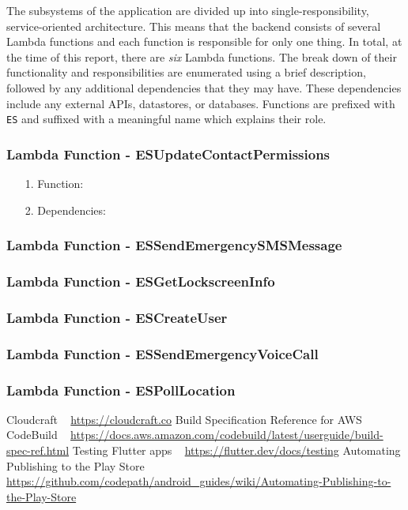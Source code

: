 \documentclass[10pt, a4paper]{article}
\begin{document}
The subsystems of the application are divided up into single-responsibility, service-oriented architecture. This means that the backend consists of several Lambda functions and each function is responsible for only one thing. In total, at the time of this report, there are \emph{six} Lambda functions. The break down of their functionality and responsibilities are enumerated using a brief description, followed by any additional dependencies that they may have. These dependencies include any external APIs, datastores, or databases. Functions are prefixed with \texttt{ES} and suffixed with a meaningful name which explains their role.

\subsubsection{Lambda Function - ESUpdateContactPermissions}
\begin{enumerate}
	\item[1.] Function: 
	\item[2.] Dependencies: 
\end{enumerate}
\subsubsection{Lambda Function - ESSendEmergencySMSMessage }
\subsubsection{Lambda Function - ESGetLockscreenInfo }
\subsubsection{Lambda Function - ESCreateUser }
\subsubsection{Lambda Function - ESSendEmergencyVoiceCall }
\subsubsection{Lambda Function - ESPollLocation }


	
\begin{thebibliography}{9}
Cloudcraft ~ \url{https://cloudcraft.co}
Build Specification Reference for AWS CodeBuild ~ \url{https://docs.aws.amazon.com/codebuild/latest/userguide/build-spec-ref.html}
Testing Flutter apps ~ \url{https://flutter.dev/docs/testing}
Automating Publishing to the Play Store ~ \url{https://github.com/codepath/android_guides/wiki/Automating-Publishing-to-the-Play-Store}
\end{thebibliography}
\end{document}

